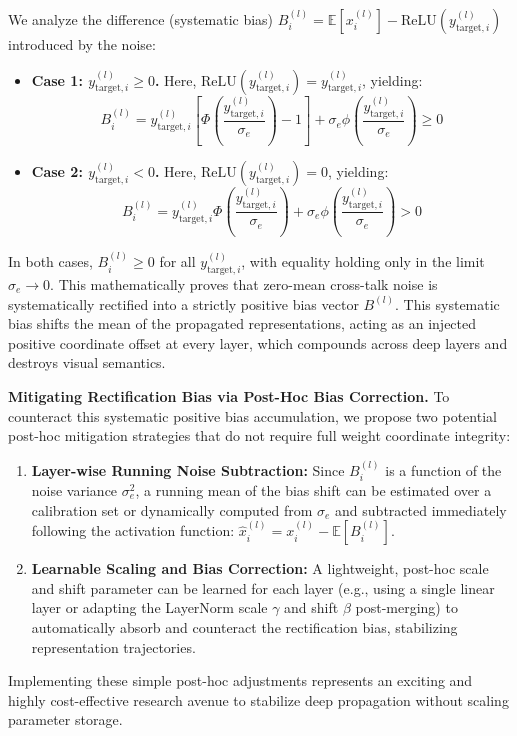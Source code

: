 \documentclass{article}
\theoremstyle{plain}
\theoremstyle{definition}
\theoremstyle{remark}
\begin{document}
We analyze the difference (systematic bias) $B_i^{(l)} = \mathbb{E}[x_i^{(l)}] - \text{ReLU}\left( y_{\text{target}, i}^{(l)} \right)$ introduced by the noise:
\begin{itemize}
\item \textbf{Case 1: $y_{\text{target}, i}^{(l)} \geq 0$.} Here, $\text{ReLU}\left( y_{\text{target}, i}^{(l)} \right) = y_{\text{target}, i}^{(l)}$, yielding:
\begin{equation}
B_i^{(l)} = y_{\text{target}, i}^{(l)} \left[ \Phi\left( \frac{y_{\text{target}, i}^{(l)}}{\sigma_e} \right) - 1 \right] + \sigma_e \phi\left( \frac{y_{\text{target}, i}^{(l)}}{\sigma_e} \right) \geq 0
\end{equation}
\item \textbf{Case 2: $y_{\text{target}, i}^{(l)} < 0$.} Here, $\text{ReLU}\left( y_{\text{target}, i}^{(l)} \right) = 0$, yielding:
\begin{equation}
B_i^{(l)} = y_{\text{target}, i}^{(l)} \Phi\left( \frac{y_{\text{target}, i}^{(l)}}{\sigma_e} \right) + \sigma_e \phi\left( \frac{y_{\text{target}, i}^{(l)}}{\sigma_e} \right) > 0
\end{equation}
\end{itemize}

In both cases, $B_i^{(l)} \geq 0$ for all $y_{\text{target}, i}^{(l)}$, with equality holding only in the limit $\sigma_e \to 0$. This mathematically proves that zero-mean cross-talk noise is systematically rectified into a strictly positive bias vector $B^{(l)}$. This systematic bias shifts the mean of the propagated representations, acting as an injected positive coordinate offset at every layer, which compounds across deep layers and destroys visual semantics.

\textbf{Mitigating Rectification Bias via Post-Hoc Bias Correction.} To counteract this systematic positive bias accumulation, we propose two potential post-hoc mitigation strategies that do not require full weight coordinate integrity:
\begin{enumerate}
\item \textbf{Layer-wise Running Noise Subtraction:} Since $B_i^{(l)}$ is a function of the noise variance $\sigma_e^2$, a running mean of the bias shift can be estimated over a calibration set or dynamically computed from $\sigma_e$ and subtracted immediately following the activation function: $\hat{x}_i^{(l)} = x_i^{(l)} - \mathbb{E}[B_i^{(l)}]$.
\item \textbf{Learnable Scaling and Bias Correction:} A lightweight, post-hoc scale and shift parameter can be learned for each layer (e.g., using a single linear layer or adapting the LayerNorm scale $\gamma$ and shift $\beta$ post-merging) to automatically absorb and counteract the rectification bias, stabilizing representation trajectories.
\end{enumerate}
Implementing these simple post-hoc adjustments represents an exciting and highly cost-effective research avenue to stabilize deep propagation without scaling parameter storage.
\end{document}
